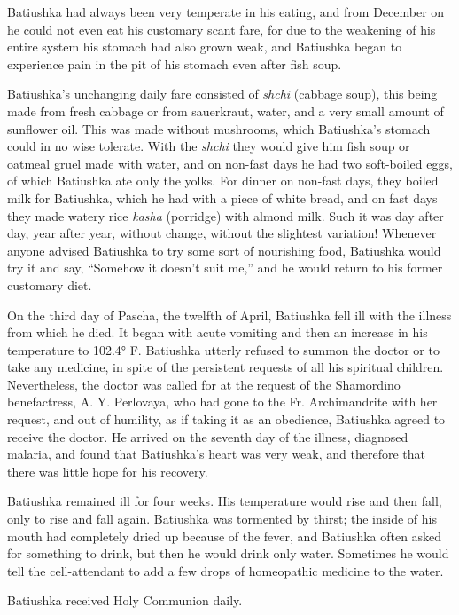 Batiushka had always been very temperate in his eating, and from December on he could not even eat his customary scant fare, for due to the weakening of his entire system his stomach had also grown weak, and Batiushka began to experience pain in the pit of his stomach even after fish soup.

Batiushka's unchanging daily fare consisted of \textit{shchi} (cabbage soup), this being made from fresh cabbage or from sauerkraut, water, and a very small amount of sunflower oil. This was made without mushrooms, which Batiushka's stomach could in no wise tolerate. With the \textit{shchi} they would give him fish soup or oatmeal gruel made with water, and on non-fast days he had two soft-boiled eggs, of which Batiushka ate only the yolks. For dinner on non-fast days, they boiled milk for Batiushka, which he had with a piece of white bread, and on fast days they made watery rice \textit{kasha} (porridge) with almond milk. Such it was day after day, year after year, without change, without the slightest variation! Whenever anyone advised Batiushka to try some sort of nourishing food, Batiushka would try it and say, ``Somehow it doesn't suit me,'' and he would return to his former customary diet.

On the third day of Pascha, the twelfth of April, Batiushka fell ill with the illness from which he died. It began with acute vomiting and then an increase in his temperature to 102.4° F. Batiushka utterly refused to summon the doctor or to take any medicine, in spite of the persistent requests of all his spiritual children. Nevertheless, the doctor was called for at the request of the Shamordino benefactress, A. Y. Perlovaya, who had gone to the Fr. Archimandrite with her request, and out of humility, as if taking it as an obedience, Batiushka agreed to receive the doctor. He arrived on the seventh day of the illness, diagnosed malaria, and found that Batiushka's heart was very weak, and therefore that there was little hope for his recovery.

Batiushka remained ill for four weeks. His temperature would rise and then fall, only to rise and fall again. Batiushka was tormented by thirst; the inside of his mouth had completely dried up because of the fever, and Batiushka often asked for something to drink, but then he would drink only water. Sometimes he would tell the cell-attendant to add a few drops of homeopathic medicine to the water.

Batiushka received Holy Communion daily.

